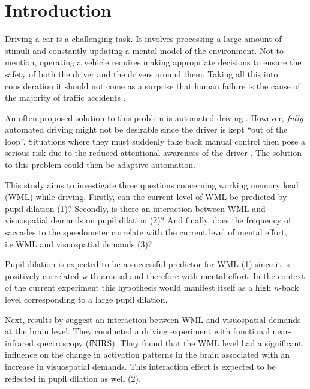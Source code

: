 
\section{Introduction}\label{sec:introduction}

Driving a car is a challenging task. 
It involves processing a large amount of stimuli and constantly updating a mental model of the environment.
Not to mention, operating a vehicle requires making appropriate decisions to ensure the safety of both the driver and the drivers around them.
Taking all this into consideration it should not come as a surprise that human failure is the cause of the majority of traffic accidents \citep{DeWaard1996}.

An often proposed solution to this problem is automated driving \citep{Cabrall2018}.
However, \textit{fully} automated driving might not be desirable since the driver is kept ``out of the loop''.
Situations where they must suddenly take back manual control then pose a serious risk due to the reduced attentional awareness of the driver \citep{Dijksterhuis2012}.
The solution to this problem could then be adaptive automation.






This study aims to investigate three questions concerning working memory load (WML) while driving. 
Firstly, can the current level of WML be predicted by pupil dilation (1)? 
Secondly, is there an interaction between WML and visuospatial demands on pupil dilation (2)?
And finally, does the frequency of saccades to the speedometer correlate with the current level of mental effort, i.e.\@ WML and visuospatial demands (3)?

Pupil dilation is expected to be a successful predictor for WML (1) since it is positively correlated with arousal \citep{Mathot2018} and therefore with mental effort.
In the context of the current experiment this hypothesis would manifest itself as a high \(n\)-back level corresponding to a large pupil dilation.

Next, results by \citet{Scheunemann2019} suggest an interaction between WML and visuospatial demands at the brain level. 
They conducted a driving experiment with functional near-infrared spectroscopy (fNIRS).
They found that the WML level had a significant influence on the change in activation patterns in the brain associated with an increase in visuospatial demands.
This interaction effect is expected to be reflected in pupil dilation as well (2).

